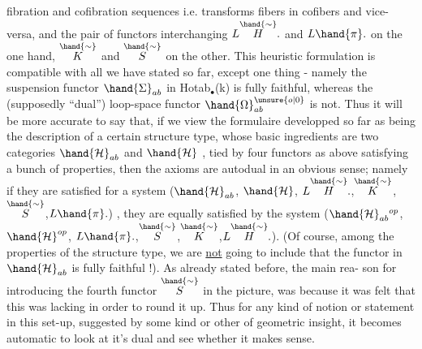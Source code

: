 
fibration and cofibration sequences i.e. transforms fibers in cofibers
and vice-versa, and the pair of functors interchanging $L\overset{\hand{\sim}}{H}.$ and $L\hand{\pi}.$
on the one hand, $\overset{\hand{\sim}}{K}$ and $\overset{\hand{\sim}}{S}$ on the other. This heuristic formulation is
compatible with all we have stated so far, except one thing - namely
the suspension functor $\hand{\Sigma}_{ab}$ in Hotab$_{\bullet}$(k) is fully faithful, whereas the
(supposedly ``dual'') loop-space functor $\hand{\Omega}^{\unsure{o|0}}_{ab}$ is not. Thus it will be more
accurate to say that, if we view the formulaire developped so far as
being  the description of a certain structure type, whose basic
ingredients are two categories $\hand{\mathcal{H}}_{ab}$ and $\hand{\mathcal{H}}$ ,  tied by four functors
as above satisfying a bunch of properties, then the axioms are autodual
in an obvious sense; namely if they are satisfied for a system 
($\hand{\mathcal{H}}_{ab}$, $\hand{\mathcal{H}}$, $L\overset{\hand{\sim}}{H}.$,$\overset{\hand{\sim}}{K}$,$\overset{\hand{\sim}}{S}$,$L\hand{\pi}.$) , they are equally satisfied by the system
($\hand{\mathcal{H}}_{ab}{}^{op}$,$\hand{\mathcal{H}}^{op}$, $L\hand{\pi}.$,$\overset{\hand{\sim}}{S}$,$\overset{\hand{\sim}}{K}$,$L\overset{\hand{\sim}}{H}.$). (Of course, among the properties of the
structure type, we are \uline{not} going to include that the   functor
in $\hand{\mathcal{H}}_{ab}$ is fully faithful !). As already stated before, the main rea-%
son for introducing the fourth functor $\overset{\hand{\sim}}{S}$ in the picture, was because it
was felt that this was lacking in  order to round it up. Thus
for any kind of notion or statement in this set-up, suggested by some
kind or other of geometric insight, it becomes automatic to look at
\margin{$\ulcorner$}it's dual and see whether it makes sense.\hand{$\rceil$}

